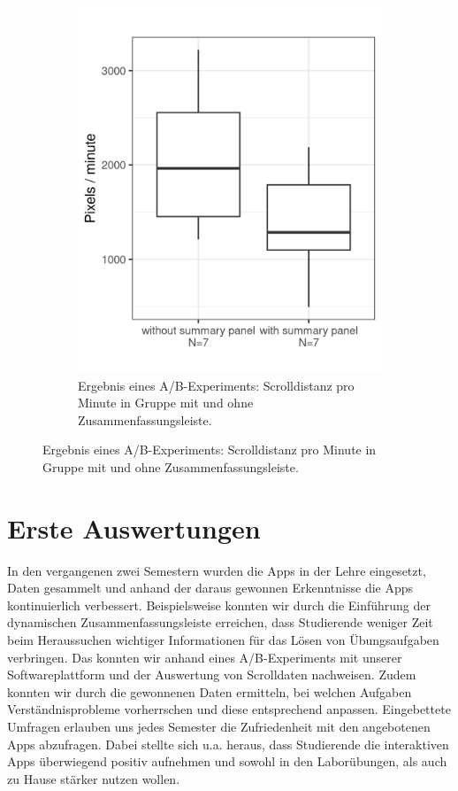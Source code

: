 \documentclass[a0,portrait]{a0poster}
\begin{document}
\begin{multicols}{2}
\begin{figure}[H]
\begin{subfigure}[h]{0.3\linewidth}
\includegraphics[width=\linewidth]{summarypanel_scrolldist}  %
\caption{Ergebnis eines A/B-Experiments: Scrolldistanz pro Minute in Gruppe mit und ohne Zusammenfassungsleiste.}
\end{subfigure}
\hfill
\end{figure}


\section*{Erste Auswertungen}

In den vergangenen zwei Semestern wurden die Apps in der Lehre eingesetzt, Daten gesammelt und anhand der daraus gewonnen Erkenntnisse die Apps kontinuierlich verbessert. Beispielsweise konnten wir durch die Einführung der dynamischen Zusammenfassungsleiste erreichen, dass Studierende weniger Zeit beim Heraussuchen wichtiger Informationen für das Lösen von Übungsaufgaben verbringen. Das konnten wir anhand eines A/B-Experiments mit unserer Softwareplattform und der Auswertung von Scrolldaten nachweisen. Zudem konnten wir durch die gewonnenen Daten ermitteln, bei welchen Aufgaben Verständnisprobleme vorherrschen und diese entsprechend anpassen. Eingebettete Umfragen erlauben uns jedes Semester die Zufriedenheit mit den angebotenen Apps abzufragen. Dabei stellte sich u.a. heraus, dass Studierende die interaktiven Apps überwiegend positiv aufnehmen und sowohl in den Laborübungen, als auch zu Hause stärker nutzen wollen.


\end{multicols}
\end{document}
